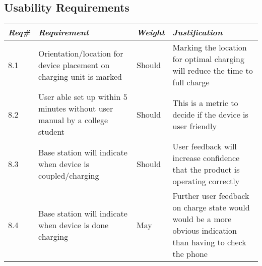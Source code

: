     
    \subsection{Usability Requirements}
        \begin{centering}
        \begin{tabular}{|l|m{7cm}|l|m{7cm}|}        \hline
        \textit{\textbf{Req\#}}	& \textit{\textbf{Requirement}} &\textit{\textbf{Weight}}&\textit{\textbf{Justification}} \\ \hline
        8.1 & Orientation/location for device placement on charging unit is marked & Should & Marking the location for optimal charging will reduce the time to full charge\\ \hline
        8.2 & User able set up within 5 minutes without user manual by a college student & Should & This is a metric to decide if the device is user friendly \\ \hline
        8.3 & Base station will indicate when device is coupled/charging & Should & User feedback will increase confidence that the product is operating correctly                                \\ \hline
        8.4 & Base station will indicate when device is done charging & May& Further user feedback on charge state would would be a more obvious indication than having to check the phone \\ \hline
        \end{tabular}
        \end{centering}

\newpage